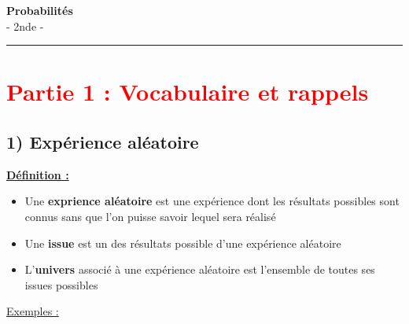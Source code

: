 \documentclass[12pt]{article}
\begin{document}

\newpage

\begin{center}
    {\LARGE \textbf{Probabilités}}\\[4mm]
    {\large - 2nde -}
\end{center}

\hrule
\vspace{0pt}


\section*{\textcolor{red}{Partie 1 : Vocabulaire et rappels}}

\vspace{5pt}

\subsection*{\hspace{1cm} 1) Expérience aléatoire}

\vspace{5pt}

\begin{mdframed}[
    linewidth=1pt,
    roundcorner=5pt,
    linecolor=ForestGreen,
    innertopmargin=10pt,
    innerbottommargin=10pt
]
{\color{ForestGreen}
\textbf{\underline{Définition :}}}

\begin{itemize}
    \item Une \textbf{exprience aléatoire} est une expérience dont les résultats possibles sont connus
    sans que l'on puisse savoir lequel sera réalisé
    \item Une \textbf{issue} est un des résultats possible d'une expérience aléatoire
    \item L'\textbf{univers} associé à une expérience aléatoire est l'ensemble de toutes ses issues
    possibles
\end{itemize}

\end{mdframed}

\vspace{5pt}
\underline{Exemples :}
\end{document}
